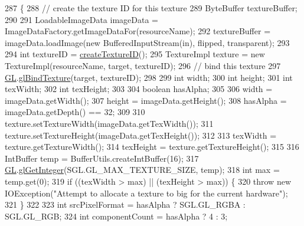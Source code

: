 \begin{DoxyCode}
287     \{ 
288         \textcolor{comment}{// create the texture ID for this texture }
289         ByteBuffer textureBuffer;
290         
291         LoadableImageData imageData = ImageDataFactory.getImageDataFor(resourceName);
292         textureBuffer = imageData.loadImage(\textcolor{keyword}{new} BufferedInputStream(in), flipped, transparent);
293 
294         \textcolor{keywordtype}{int} textureID = \mbox{\hyperlink{classorg_1_1newdawn_1_1slick_1_1opengl_1_1_internal_texture_loader_a1bebab39014659d66c3f45bfefb678a1}{createTextureID}}(); 
295         TextureImpl texture = \textcolor{keyword}{new} TextureImpl(resourceName, target, textureID); 
296         \textcolor{comment}{// bind this texture }
297         \mbox{\hyperlink{classorg_1_1newdawn_1_1slick_1_1opengl_1_1_internal_texture_loader_a302f0e97810ce583189425dd693ae4c2}{GL}}.\mbox{\hyperlink{interfaceorg_1_1newdawn_1_1slick_1_1opengl_1_1renderer_1_1_s_g_l_a7b546bba69c511f7d96d055ac1ed6a21}{glBindTexture}}(target, textureID); 
298  
299         \textcolor{keywordtype}{int} width;
300         \textcolor{keywordtype}{int} height;
301         \textcolor{keywordtype}{int} texWidth;
302         \textcolor{keywordtype}{int} texHeight;
303         
304         \textcolor{keywordtype}{boolean} hasAlpha;
305         
306         width = imageData.getWidth();
307         height = imageData.getHeight();
308         hasAlpha = imageData.getDepth() == 32;
309         
310         texture.setTextureWidth(imageData.getTexWidth());
311         texture.setTextureHeight(imageData.getTexHeight());
312 
313         texWidth = texture.getTextureWidth();
314         texHeight = texture.getTextureHeight();
315 
316         IntBuffer temp = BufferUtils.createIntBuffer(16);
317         \mbox{\hyperlink{classorg_1_1newdawn_1_1slick_1_1opengl_1_1_internal_texture_loader_a302f0e97810ce583189425dd693ae4c2}{GL}}.\mbox{\hyperlink{interfaceorg_1_1newdawn_1_1slick_1_1opengl_1_1renderer_1_1_s_g_l_ab04cb68029b55582eb4b17b489cbbb2f}{glGetInteger}}(SGL.GL\_MAX\_TEXTURE\_SIZE, temp);
318         \textcolor{keywordtype}{int} max = temp.get(0);
319         \textcolor{keywordflow}{if} ((texWidth > max) || (texHeight > max)) \{
320             \textcolor{keywordflow}{throw} \textcolor{keyword}{new} IOException(\textcolor{stringliteral}{"Attempt to allocate a texture to big for the current hardware"});
321         \}
322         
323         \textcolor{keywordtype}{int} srcPixelFormat = hasAlpha ? SGL.GL\_RGBA : SGL.GL\_RGB;
324         \textcolor{keywordtype}{int} componentCount = hasAlpha ? 4 : 3;

\end{DoxyCode}
